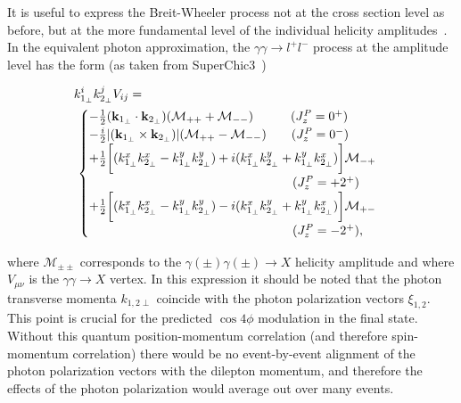 \documentclass[12pt,epjc3]{svjour3}\sloppy
\begin{document}

It is useful to express the Breit-Wheeler process not at the cross section level as before, but at the more fundamental level of the individual helicity amplitudes~\cite{DISPERSIONRELATIONLIGHT,budnev_two-photon_1975,brodsky_two-photon_1971}. 
In the equivalent photon approximation, the $\gamma\gamma \rightarrow l^+l^-$ process at the amplitude level has the form (as taken from SuperChic3~\cite{SuperChic3})

\begin{align}
    \begin{split}
  & k_{1_\perp}^i k_{2_\perp}^j V_{ij} = \\
  & \,
  \begin{cases}     
    -\frac{1}{2} ({\bf k}_{1_\perp}\cdot {\bf k}_{2_\perp})(\mathcal{M}_{++}+\mathcal{M}_{--}) \quad\qquad (J^P_z=0^+)  \\ 
    -\frac{i}{2} |({\bf k}_{1_\perp}\times {\bf k}_{2_\perp})|(\mathcal{M}_{++}-\mathcal{M}_{--}) \qquad  (J^P_z=0^-) \\ 
    +\frac{1}{2}\bigg[(k_{1_\perp}^x k_{2_\perp}^x-k_{1_\perp}^y k_{2_\perp}^y) +i(k_{1_\perp}^x k_{2_\perp}^y+k_{1_\perp}^y k_{2_\perp}^x)\bigg]\mathcal{M}_{-+}  \\ 
    \qquad\qquad\qquad\qquad\qquad\qquad\qquad\qquad\  (J^P_z=+2^+)\\ 
    +\frac{1}{2}\bigg[(k_{1_\perp}^x k_{2_\perp}^x-k_{1_\perp}^y k_{2_\perp}^y) -i(k_{1_\perp}^x k_{2_\perp}^y+k_{1_\perp}^y k_{2_\perp}^x)\bigg]\mathcal{M}_{+-} \\ 
    \qquad\qquad\qquad\qquad\qquad\qquad\qquad\qquad\  (J^P_z=-2^+),     
  \end{cases}\label{Agen}
  \end{split}
\end{align}

where $\mathcal{M}_{\pm \pm}$ corresponds to the $\gamma(\pm) \gamma(\pm) \to X$ helicity amplitude and where $V_{\mu\nu}$ is the $\gamma\gamma \to X$ vertex. 
In this expression it should be noted that the photon transverse momenta $k_{1,2\perp}$ coincide with the photon polarization vectors $\xi_{1,2}$.  This point is crucial for the predicted $\cos4\phi$ modulation in the final state. Without this quantum position-momentum correlation (and therefore spin-momentum correlation) there would be no event-by-event alignment of the photon polarization vectors with the dilepton momentum, and therefore the effects of the photon polarization would average out over many events. 
\end{document}

